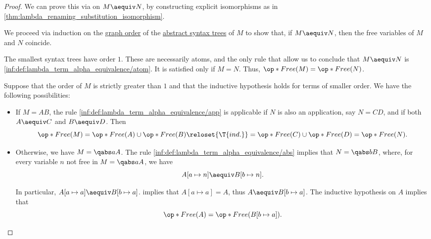 \begin{proof}
   We can prove this via  on \( M \aequiv N \), by constructing explicit isomorphisms as in \cref{thm:lambda_renaming_substitution_isomorphism}.

   We proceed via induction on the \hyperref[def:graph_cardinality/order]{graph order} of the \hyperref[def:lambda_term_ast]{abstract syntax trees} of \( M \) to show that, if \( M \aequiv N \), then the free variables of \( M \) and \( N \) coincide.

  The smallest syntax trees have order \( 1 \). These are necessarily atoms, and the only rule that allow us to conclude that \( M \aequiv N \) is \ref{inf:def:lambda_term_alpha_equivalence/atom}. It is satisfied only if \( M = N \). Thus, \( \op*{Free}(M) = \op*{Free}(N) \).

  Suppose that the order of \( M \) is strictly greater than \( 1 \) and that the inductive hypothesis holds for terms of smaller order. We have the following possibilities:
  \begin{itemize}
    \item If \( M = AB \), the rule \ref{inf:def:lambda_term_alpha_equivalence/app} is applicable if \( N \) is also an application, say \( N = CD \), and if both \( A \aequiv C \) and \( B \aequiv D \). Then
    \begin{equation*}
      \op*{Free}(M)
      =
      \op*{Free}(A) \cup \op*{Free}(B)
      \reloset{\T{ind.}} =
      \op*{Free}(C) \cup \op*{Free}(D)
      =
      \op*{Free}(N).
    \end{equation*}

    \item Otherwise, we have \( M = \qabs a A \). The rule \ref{inf:def:lambda_term_alpha_equivalence/abs} implies that \( N = \qabs b B \), where, for every variable \( n \) not free in \( M = \qabs a A \), we have
    \begin{equation*}
      A[a \mapsto n] \aequiv B[b \mapsto n].
    \end{equation*}

    In particular, \( A[a \mapsto a] \aequiv B[b \mapsto a] \).  implies that \( A[a \mapsto a] = A \), thus \( A \aequiv B[b \mapsto a] \). The inductive hypothesis on \( A \) implies that
    \begin{equation}\label{eq:thm:def:lambda_term_alpha_equivalence/free/proof/abs/a_free}
      \op*{Free}(A) = \op*{Free}(B[b \mapsto a]).
    \end{equation}


\end{itemize}
\end{proof}

